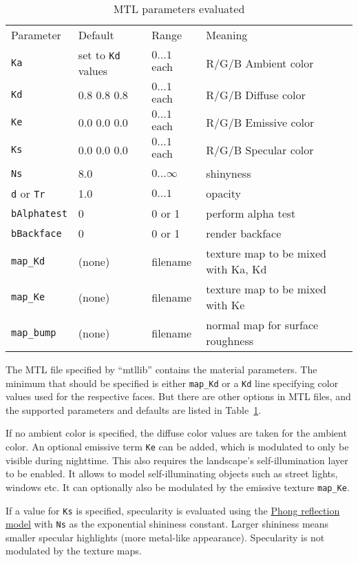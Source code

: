 \documentclass[a4paper]{article}
\newcommand{\cmd}[1]{\texttt{#1}}
\begin{document}
\begin{table}[b]
\begin{tabular}{llll}
Parameter           &Default      &Range           & Meaning\\
\cmd{Ka}            &set to \cmd{Kd} values & $0\dots1$ each& R/G/B Ambient color\\
\cmd{Kd}            &0.8 0.8 0.8  & $0\dots1$ each & R/G/B Diffuse color\\
\cmd{Ke}            &0.0 0.0 0.0  & $0\dots1$ each & R/G/B Emissive color\\
\cmd{Ks}            &0.0 0.0 0.0  & $0\dots1$ each & R/G/B Specular color\\
\cmd{Ns}            &8.0          & $0\dots\infty$ & shinyness \\
\cmd{d} or \cmd{Tr} &1.0          & $0\dots1$      & opacity \\
\cmd{bAlphatest}    &0            & 0 or 1         & perform alpha test \\
\cmd{bBackface}     &0            & 0 or 1         & render backface \\
\cmd{map\_Kd}       & (none)      & filename       & texture map to be mixed with Ka, Kd \\
\cmd{map\_Ke}       & (none)      & filename       & texture map to be mixed with Ke \\
\cmd{map\_bump}     & (none)      & filename       & normal map for surface roughness  
\end{tabular}
\caption{MTL parameters evaluated}
\label{tab:MTL}
\end{table}

The MTL file specified by ``mtllib'' contains the material parameters. The
minimum that should be specified is either \cmd{map\_Kd} or a \cmd{Kd} line
specifying color values used for the respective faces. But there are other
options in MTL files, and the supported parameters and defaults are listed in
Table~\ref{tab:MTL}.

If no ambient color is specified, the diffuse color values are taken for the
ambient color. An optional emissive term \cmd{Ke} can be added, which is
modulated to only be visible during nighttime. This also requires the
landscape's self-illumination layer to be enabled. It allows to model
self-illuminating objects such as street lights, windows etc. It can optionally
also be modulated by the emissive texture \cmd{map\_Ke}.

If a value for \cmd{Ks} is specified, specularity is evaluated using the
\href{https://en.wikipedia.org/wiki/Phong_reflection_model}{Phong reflection
model} with \cmd{Ns} as the exponential shininess constant. Larger shininess
means smaller specular highlights (more metal-like appearance). Specularity is
not modulated by the texture maps.
\end{document}
